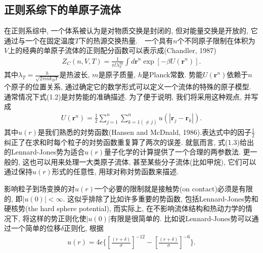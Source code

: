     \subsection{正则系综下的单原子流体}
    在正则系综中, 一个体系被认为是对物质交换是封闭的, 但对能量交换是开放的,
    它通过与一个在固定温度$T$下的热源交换热量.　一个具有$n$个不同原子限制在体积为$V$上的经典的单原子流体的正则配分函数可以表示成(Chandler,
    1987)
\label{subsec.equations}
    \begin{equation}
        \begin{aligned}
            Z_C(n, V, T)=\frac{1}{n!\lambda_T^{3n}}\int d\bm{r}^n
            \exp[-\beta U(\bm{r}^n)].
        \end{aligned}
        \label{eq.1}
    \end{equation}
其中$\lambda_T=\frac{h}{\sqrt{2\pi mk_BT}}$是热波长, $m$是原子质量,
$h$是Planck常数. 势能$U(\bm{r}^n)$依赖于$n$个原子的位置关系,
通过确定它的数学形式可以定义一个流体的特殊的原子模型.
通常情况下式(1.2)是対势能的准确描述. 为了便于说明, 我们将采用这种观点,
并写成\\
\label{subsec.equations}
   \begin{equation}
       \begin{aligned}
           U(\bm{r}^n)=\frac{1}{2}\sum_{j=1}^n \sum_{k=1(\neq j)}^n
           u(|\bm{r}_j-\bm{r}_k|).
       \end{aligned}
       \label{eq.2}
    \end{equation}
其中$u(r)$是我们熟悉的対势函数(Hansen and McDnald,
1986).表达式中的因子$\frac{1}{2}$纠正了在求和时每个粒子的対势函数重复算了两次的误差.
就氩而言,
式(1.3)给出的Lennard-Jones势为适合$u(r)$量子化学的计算提供了一个合理的两参数法.
更一般的, 这也可以用来处理一大类原子流体, 甚至某些分子流体(比如甲烷),
它们可以通过保持$u(r)$形式的任意性, 用球对称対势函数来描述.
\par
影响粒子到场变换的对$u(r)$一个必要的限制就是接触势(on
contact)必须是有限的, 即$|u(0)|<\infty$. 这似乎排除了比如许多重要的势函数,
包括Lennard-Jones势和硬核势(the hard sphere potential),
而实际上, 在不影响流体结构和热动力学的情况下,
将这样的势正则化使$|u(0)|$有限是很简单的.
比如说Lennard-Jones势可以通过一个简单的位移$\delta$正则化, 根据
\label{subsec.equations}
   \begin{equation}
       \begin{aligned}
           u(r)=4\epsilon\{ [\frac{(r+\delta)}{\sigma}]^{-12}-
           [\frac{(r+\delta)}{\sigma}]^{-6} \}.
      \end{aligned}
       \label{eq.3}
    \end{equation}
